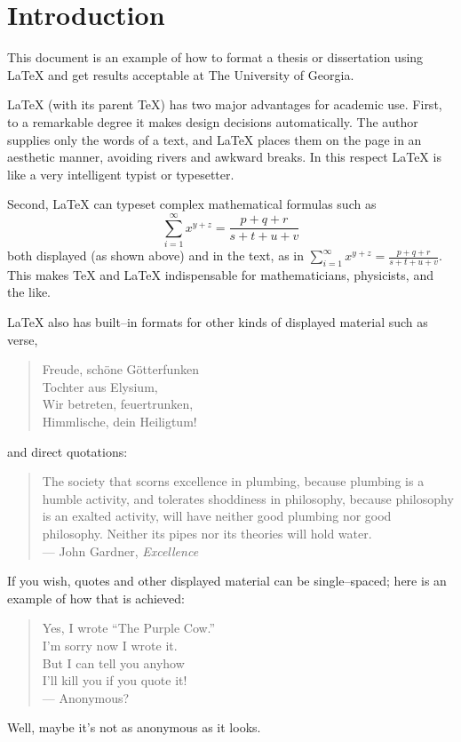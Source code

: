 \chapter{Introduction}

This document is an example of how to format a thesis or dissertation 
using LaTeX  and get results acceptable at The University of Georgia.

LaTeX (with its parent TeX)
has two major advantages for academic use.  First, to a remarkable
degree it makes design decisions automatically.  The author supplies 
only the words of a text, and LaTeX places them on the page in an 
aesthetic manner, avoiding rivers and awkward breaks.  In this respect 
LaTeX is like a very intelligent typist or typesetter.

Second, LaTeX can typeset complex mathematical formulas such as
\[
\sum_{i=1}^{\infty} x^{y+z} = \frac{p+q+r}{s+t+u+v}
\]
both displayed (as shown above) and in the text, as in
$\sum_{i=1}^{\infty} x^{y+z} = \frac{p+q+r}{s+t+u+v}$.
This makes TeX and LaTeX indispensable for mathematicians, physicists,
and the like.

LaTeX also has built--in formats for other kinds of displayed material 
such as verse,
\begin{verse}
Freude, sch\"{o}ne G\"{o}tterfunken  \\
Tochter aus Elysium,                 \\
Wir betreten, feuertrunken,          \\
Himmlische, dein Heiligtum!          \\
\end{verse}
and direct quotations:
\begin{quote}
The society that scorns excellence in plumbing, because plumbing is a 
humble activity, and tolerates shoddiness in philosophy, because 
philosophy is an exalted activity, will have neither good plumbing nor 
good philosophy.  Neither its pipes nor its theories will hold water.\\
\hspace*{\fill} --- John Gardner, {\em Excellence}
\end{quote}
If you wish, quotes and other displayed material can be single--spaced; 
here is an example of how that is achieved:
\begin{verse}
\begin{singlespace}
Yes, I wrote ``The Purple Cow.'' \\
I'm sorry now I wrote it. \\
But I can tell you anyhow \\
I'll kill you if you quote it! \\
\hfill --- Anonymous?
\end{singlespace}
\end{verse}
Well, maybe it's not as anonymous as it looks.

